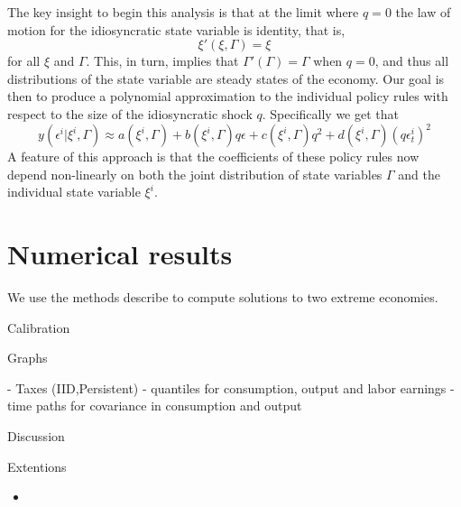 \documentclass[thmsb,11pt]{article}
\begin{document}
The key insight to begin this analysis is that at the limit where $q = 0$ the law of motion for the idiosyncratic state variable is identity, that is,
\[
	\xi'(\xi,\Gamma) = \xi 
\] for all $\xi$ and $\Gamma$.  This, in turn, implies that $\Gamma'(\Gamma) = \Gamma$ when $q=0$, and thus all distributions of the state variable are steady states of the economy.  Our goal is then to produce a polynomial approximation to the individual policy rules with respect to the size of the idiosyncratic shock $q$.  Specifically we get that 
\[
	y(\epsilon^i | \xi^i,\Gamma) \approx a(\xi^i,\Gamma) + b(\xi^i,\Gamma) q\epsilon + c(\xi^i,\Gamma) q^2 + d(\xi^i,\Gamma)(q\epsilon^i_t)^2
\]A feature of this approach is that the coefficients of these policy rules now depend non-linearly on both the joint distribution of state variables $\Gamma$ and the individual state variable $\xi^i$.

  \section{Numerical results}
We use the methods describe to compute solutions to two extreme economies. 

Calibration  

Graphs

- Taxes (IID,Persistent)
- quantiles for consumption, output and labor earnings
- time paths for covariance in consumption and output




Discussion



Extentions









  \begin{itemize}
  \item 
  \end{itemize}
\end{document}
